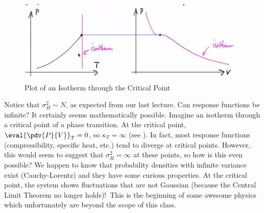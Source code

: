 \documentclass[a4paper,twoside,master.tex]{subfiles}
\begin{document}
\begin{figure}[h]
    \centering
    \includegraphics[width=\textwidth]{figures/lec_26_critical_point.png}
    \caption{Plot of an Isotherm through the Critical Point}
    \label{fig:lec_26_critical_point}
\end{figure}
Notice that $ \sigma_H^2 \sim N $, as expected from our last lecture. Can response functions be infinite? It certainly seems mathematically possible. Imagine an isotherm through a critical point of a phase transition. At the critical point, $ \eval{\pdv{P}{V}}_{T} = 0 $, so $ \kappa_T = \infty $ (see ). In fact, most response functions (compressibility, specific heat, etc.) tend to diverge at critical points. However, this would seem to suggest that $ \sigma_H^2 = \infty $ at these points, so how is this even possible? We happen to know that probability densities with infinite variance exist (Cauchy-Lorentz) and they have some curious properties. At the critical point, the system shows fluctuations that are not Gaussian (because the Central Limit Theorem no longer holds)!\ This is the beginning of some awesome physics which unfortunately are beyond the scope of this class.
\end{document}
